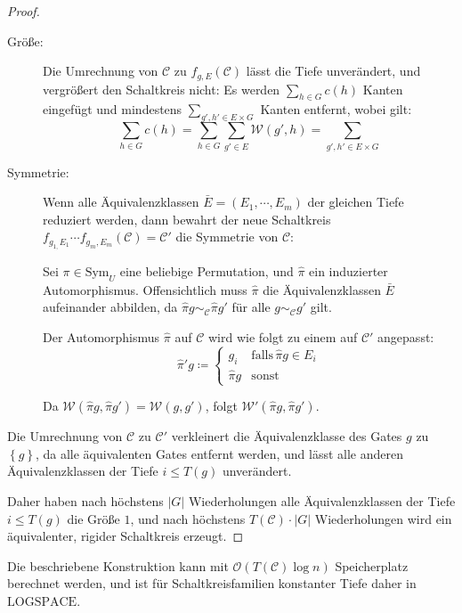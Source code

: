 \begin{proof}
\begin{description}
\item [{Größe:}] Die Umrechnung von $\mathcal{C}$ zu $f_{g,E}\left(\mathcal{C}\right)$
lässt die Tiefe unverändert, und vergrößert den Schaltkreis nicht:
Es werden $\sum_{h\in G}c\left(h\right)$ Kanten eingefügt und mindestens
$\sum_{g',h'\in E\times G}$ Kanten entfernt, wobei gilt:
\[
\sum_{h\in G}c\left(h\right)=\sum_{h\in G}\sum_{g'\in E}\mathcal{W}\left(g',h\right)=\sum_{g',h'\in E\times G}
\]
\item [{Symmetrie:}] Wenn alle Äquivalenzklassen $\bar{E}=\left(E_{1},\cdots,E_{m}\right)$
der gleichen Tiefe reduziert werden, dann bewahrt der neue Schaltkreis
$f_{g_{1,}E_{1}}\cdots f_{g_{m},E_{m}}\left(\mathcal{C}\right)=\mathcal{C}'$
die Symmetrie von $\mathcal{C}$:

Sei $\pi\in\mathrm{Sym}_{U}$ eine beliebige Permutation, und $\hat{\pi}$
ein induzierter Automorphismus. Offensichtlich muss $\hat{\pi}$ die
Äquivalenzklassen $\bar{E}$ aufeinander abbilden, da $\hat{\pi}g\sim_{\mathcal{C}}\hat{\pi}g'$
für alle $g\sim_{\mathcal{C}}g'$ gilt.

Der Automorphismus $\hat{\pi}$ auf $\mathcal{C}$ wird wie folgt
zu einem auf $\mathcal{C}'$ angepasst:
\[
\hat{\pi}'g\coloneqq\begin{cases}
g_{i} & \mathrm{falls}\,\hat{\pi}g\in E_{i}\\
\hat{\pi}g & \mathrm{sonst}
\end{cases}
\]

Da $\mathcal{W}\left(\hat{\pi}g,\hat{\pi}g'\right)=\mathcal{W}\left(g,g'\right)$,
folgt $\mathcal{W}'\left(\hat{\pi}g,\hat{\pi}g'\right)$.

\end{description}
Die Umrechnung von $\mathcal{C}$ zu $\mathcal{C}'$ verkleinert die
Äquivalenzklasse des Gates $g$ zu $\left\{ g\right\} $, da alle
äquivalenten Gates entfernt werden, und lässt alle anderen Äquivalenzklassen
der Tiefe $i\leqslant T\left(g\right)$ unverändert.

Daher haben nach höchstens $\left|G\right|$ Wiederholungen alle Äquivalenzklassen
der Tiefe $i\leqslant T\left(g\right)$ die Größe $1$, und nach höchstens
$T\left(\mathcal{C}\right)\cdot\left|G\right|$ Wiederholungen wird
ein äquivalenter, rigider Schaltkreis erzeugt.
\end{proof}
\begin{prop}
Die beschriebene Konstruktion kann mit $\mathcal{O}\left(T\left(\mathcal{C}\right)\log n\right)$
Speicherplatz berechnet werden, und ist für Schaltkreisfamilien konstanter
Tiefe daher in $\mathrm{LOGSPACE}$.
\end{prop}
